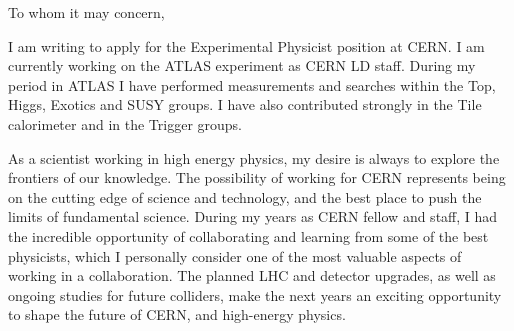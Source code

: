 \documentclass[11pt,a4paper,sans]{moderncv}        %
\begin{document}
\makecvtitle


\vfill
\vfill
\vfill


To whom it may concern,
\newline

I am writing to apply for the Experimental Physicist position at CERN.
I am currently working on the ATLAS experiment as CERN LD staff. During my period in ATLAS I have performed measurements and searches within the Top, Higgs, Exotics and SUSY groups. I have also contributed strongly in the Tile calorimeter and in the Trigger groups. 
\newline

As a scientist working in high energy physics, my desire is always to explore the frontiers of our knowledge. The possibility of working for CERN represents being on the cutting edge of science and technology, and the best place to push the limits of fundamental science.
During my years as CERN fellow and staff, I had the incredible opportunity of collaborating and learning from some of the best physicists, which I personally consider one of the most valuable aspects of working in a collaboration.
The planned LHC and detector upgrades, as well as ongoing studies for future colliders, make the next years an exciting opportunity to shape the future of CERN, and high-energy physics.
\newline
\end{document}
